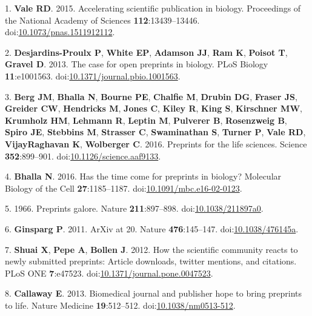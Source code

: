 \documentclass[11pt,]{article}
\begin{document}
\hypertarget{refs}{}
\hypertarget{ref-Vale2015}{}
1. \textbf{Vale RD}. 2015. Accelerating scientific publication in
biology. Proceedings of the National Academy of Sciences
\textbf{112}:13439--13446.
doi:\href{https://doi.org/10.1073/pnas.1511912112}{10.1073/pnas.1511912112}.

\hypertarget{ref-DesjardinsProulx2013}{}
2. \textbf{Desjardins-Proulx P}, \textbf{White EP}, \textbf{Adamson JJ},
\textbf{Ram K}, \textbf{Poisot T}, \textbf{Gravel D}. 2013. The case for
open preprints in biology. PLoS Biology \textbf{11}:e1001563.
doi:\href{https://doi.org/10.1371/journal.pbio.1001563}{10.1371/journal.pbio.1001563}.

\hypertarget{ref-Berg2016}{}
3. \textbf{Berg JM}, \textbf{Bhalla N}, \textbf{Bourne PE},
\textbf{Chalfie M}, \textbf{Drubin DG}, \textbf{Fraser JS},
\textbf{Greider CW}, \textbf{Hendricks M}, \textbf{Jones C},
\textbf{Kiley R}, \textbf{King S}, \textbf{Kirschner MW},
\textbf{Krumholz HM}, \textbf{Lehmann R}, \textbf{Leptin M},
\textbf{Pulverer B}, \textbf{Rosenzweig B}, \textbf{Spiro JE},
\textbf{Stebbins M}, \textbf{Strasser C}, \textbf{Swaminathan S},
\textbf{Turner P}, \textbf{Vale RD}, \textbf{VijayRaghavan K},
\textbf{Wolberger C}. 2016. Preprints for the life sciences. Science
\textbf{352}:899--901.
doi:\href{https://doi.org/10.1126/science.aaf9133}{10.1126/science.aaf9133}.

\hypertarget{ref-Bhalla2016}{}
4. \textbf{Bhalla N}. 2016. Has the time come for preprints in biology?
Molecular Biology of the Cell \textbf{27}:1185--1187.
doi:\href{https://doi.org/10.1091/mbc.e16-02-0123}{10.1091/mbc.e16-02-0123}.

\hypertarget{ref-Nature1966}{}
5. 1966. Preprints galore. Nature \textbf{211}:897--898.
doi:\href{https://doi.org/10.1038/211897a0}{10.1038/211897a0}.

\hypertarget{ref-Ginsparg2011}{}
6. \textbf{Ginsparg P}. 2011. ArXiv at 20. Nature \textbf{476}:145--147.
doi:\href{https://doi.org/10.1038/476145a}{10.1038/476145a}.

\hypertarget{ref-Shuai2012}{}
7. \textbf{Shuai X}, \textbf{Pepe A}, \textbf{Bollen J}. 2012. How the
scientific community reacts to newly submitted preprints: Article
downloads, twitter mentions, and citations. PLoS ONE \textbf{7}:e47523.
doi:\href{https://doi.org/10.1371/journal.pone.0047523}{10.1371/journal.pone.0047523}.

\hypertarget{ref-Callaway2013}{}
8. \textbf{Callaway E}. 2013. Biomedical journal and publisher hope to
bring preprints to life. Nature Medicine \textbf{19}:512--512.
doi:\href{https://doi.org/10.1038/nm0513-512}{10.1038/nm0513-512}.
\end{document}
